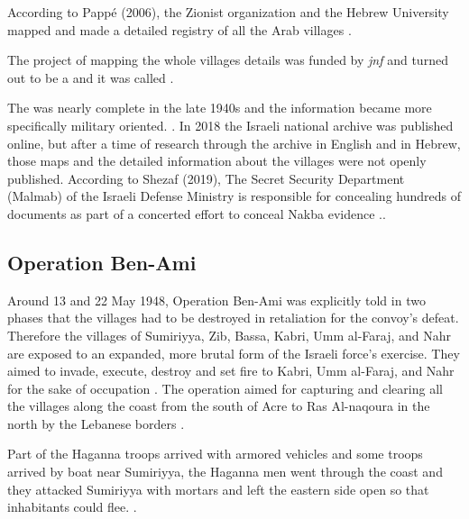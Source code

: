 According to Pappé (2006), the Zionist organization and the Hebrew University mapped and made a detailed registry of all the Arab villages \citep{Pappe2006}.



The project of mapping the whole villages details was funded by \textit{\acrfull{jnf}} and turned out to be a  and it was called \citep{Pappe2006}. 


The  was nearly complete in the late 1940s and the information became more specifically military oriented. \citep{Pappe2006}. In 2018 the Israeli national archive was published online, but after a time of research through the archive in English and in Hebrew, those maps and the detailed information about the villages were not openly published. According to Shezaf (2019), The Secret Security Department (Malmab) of the Israeli Defense Ministry is responsible for concealing hundreds of documents as part of a concerted effort to conceal Nakba evidence \citep{Shezaf2019}.\citep{Shezaf2019}.


\subsection{Operation Ben-Ami}

Around 13 and 22 May 1948, Operation Ben-Ami was explicitly told in two phases that the villages had to be destroyed in retaliation for the convoy's defeat. Therefore the villages of Sumiriyya, Zib, Bassa, Kabri, Umm al-Faraj, and Nahr are exposed to an expanded, more brutal form of the Israeli force's  exercise. They aimed to invade, execute, destroy and set fire to Kabri, Umm al-Faraj, and Nahr for the sake of occupation \citep{Pappe2006}. The operation aimed for capturing and clearing all the villages along the coast from the south of Acre to Ras Al-naqoura in the north by the Lebanese borders \citep{Morris2004, Morris2008}.

Part of the Haganna troops arrived with armored vehicles and some troops arrived by boat near Sumiriyya, the Haganna men went through the coast and they attacked Sumiriyya with mortars and left the eastern side open so that inhabitants could flee. \citep{Morris2004, Morris2008}.


